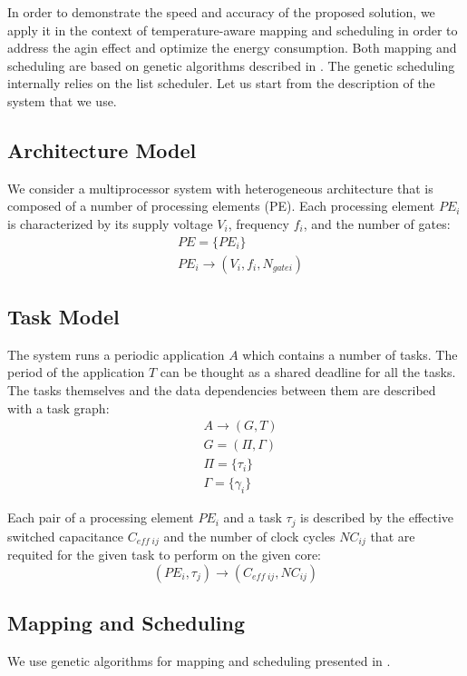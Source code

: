 In order to demonstrate the speed and accuracy of the proposed solution, we apply it in the context of temperature-aware mapping and scheduling in order to address the agin effect and optimize the energy consumption. Both mapping and scheduling are based on genetic algorithms described in \cite{schmitz2004}. The genetic scheduling internally relies on the list scheduler. Let us start from the description of the system that we use.

\subsection{Architecture Model}
We consider a multiprocessor system with heterogeneous architecture that is composed of a number of processing elements (PE). Each processing element $PE_i$ is characterized by its supply voltage $V_i$, frequency $f_i$, and the number of gates:
\begin{align*}
  & PE = \{ PE_i \} \\
  & PE_i \rightarrow (V_i, f_i, N_{gate i})
\end{align*}

\subsection{Task Model}
The system runs a periodic application $A$ which contains a number of tasks. The period of the application $T$ can be thought as a shared deadline for all the tasks. The tasks themselves and the data dependencies between them are described with a task graph:
\begin{align*}
  & A \rightarrow (G, T) \\
  & G = (\Pi, \Gamma) \\
  & \Pi = \{\tau_i\} \\
  & \Gamma = \{\gamma_i\}
\end{align*}

Each pair of a processing element $PE_i$ and a task $\tau_j$ is described by the effective switched capacitance $C_{eff \; ij}$ and the number of clock cycles $NC_{ij}$ that are requited for the given task to perform on the given core:
\begin{equation*}
  (PE_i, \tau_j) \rightarrow (C_{eff \; ij}, NC_{ij})
\end{equation*}

\subsection{Mapping and Scheduling}
We use genetic algorithms for mapping and scheduling presented in \cite{schmitz2004}.

